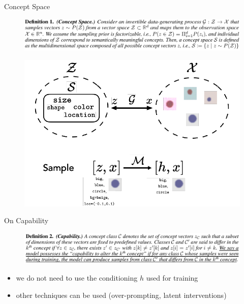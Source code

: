 \begin{frame}[t]{Concept Space}
\begin{figure}
    \centering
    \includegraphics[width=0.77\linewidth]{figures/concept_space_def.png}
\end{figure}
\begin{figure}
    \centering
    \includegraphics[width=0.38\linewidth]{figures/concept_space.png}
\end{figure}
\end{frame}


\begin{frame}[t]{On Capability}
\begin{figure}
    \centering
    \includegraphics[width=0.77\linewidth]{figures/capability_def.png}
\end{figure}

\begin{itemize}
    \item we do not need to use the conditioning $h$ used for training
    \item other techniques can be used (over-prompting, latent interventions)
\end{itemize}
\end{frame}

